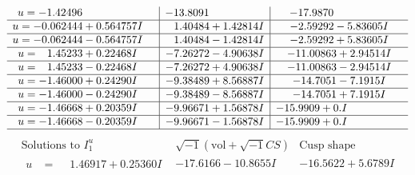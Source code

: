 \documentclass[1p]{elsarticle_modified}
\theoremstyle{definition}
\newcommand{\I}{\sqrt{-1}}
\begin{document}
$$\begin{array}{c|c|c}
\begin{aligned}
u &= -1.42496\phantom{ +0.000000I}\end{aligned}
 & -13.8091\phantom{ +0.000000I} & -17.9870\phantom{ +0.000000I} \\ \hline\begin{aligned}
u &= -0.062444 + 0.564757 I\end{aligned}
 & \phantom{-}1.40484 + 1.42814 I & -2.59292 - 5.83605 I \\ \hline\begin{aligned}
u &= -0.062444 - 0.564757 I\end{aligned}
 & \phantom{-}1.40484 - 1.42814 I & -2.59292 + 5.83605 I \\ \hline\begin{aligned}
u &= \phantom{-}1.45233 + 0.22468 I\end{aligned}
 & -7.26272 - 4.90638 I & -11.00863 + 2.94514 I \\ \hline\begin{aligned}
u &= \phantom{-}1.45233 - 0.22468 I\end{aligned}
 & -7.26272 + 4.90638 I & -11.00863 - 2.94514 I \\ \hline\begin{aligned}
u &= -1.46000 + 0.24290 I\end{aligned}
 & -9.38489 + 8.56887 I & -14.7051 - 7.1915 I \\ \hline\begin{aligned}
u &= -1.46000 - 0.24290 I\end{aligned}
 & -9.38489 - 8.56887 I & -14.7051 + 7.1915 I \\ \hline\begin{aligned}
u &= -1.46668 + 0.20359 I\end{aligned}
 & -9.96671 + 1.56878 I & -15.9909 + 0. I\phantom{ +0.000000I} \\ \hline\begin{aligned}
u &= -1.46668 - 0.20359 I\end{aligned}
 & -9.96671 - 1.56878 I & -15.9909 + 0. I\phantom{ +0.000000I}\\
 \hline 
 \end{array}$$\newpage$$\begin{array}{c|c|c}  
\text{Solutions to }I^u_{1}& \I (\text{vol} + \sqrt{-1}CS) & \text{Cusp shape}\\
 \hline 
\begin{aligned}
u &= \phantom{-}1.46917 + 0.25360 I\end{aligned}
 & -17.6166 - 10.8655 I & -16.5622 + 5.6789 I \\ \hline\begin{aligned}

\end{aligned}
\end{array}$$
\end{document}
